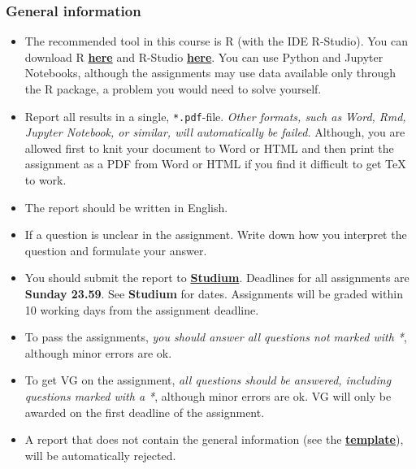 
\subsubsection*{General information}

\begin{itemize}
\itemsep0em
\item The recommended tool in this course is R (with the IDE R-Studio). You can download R \href{https://cran.r-project.org/}{\textbf{here}} and R-Studio \href{https://www.rstudio.com/products/rstudio/download/}{\textbf{here}}. You can use Python and Jupyter Notebooks, although the assignments may use data available only through the R package, a problem you would need to solve yourself.

\item  Report all results in a single, \texttt{*.pdf}-file. \emph{Other formats, such as Word, Rmd, Jupyter Notebook, or similar, will automatically be failed.} Although, you are allowed first to knit your document to Word or HTML and then print the assignment as a PDF from Word or HTML if you find it difficult to get TeX to work.

\item The report should be written in English.

\item If a question is unclear in the assignment. Write down how you interpret the question and formulate your answer.

\item You should submit the report to \href{https://studium.uu.se/}{\textbf{Studium}}. Deadlines for all assignments are \textbf{Sunday 23.59}. See \textbf{Studium} for dates. Assignments will be graded within 10 working days from the assignment deadline.

\item To pass the assignments, \emph{you should answer all questions not marked with *}, although minor errors are ok.

\item To get VG on the assignment, \emph{all questions should be answered, including questions marked with a *}, although minor errors are ok. VG will only be awarded on the first deadline of the assignment.

\item A report that does not contain the general information (see the \href{https://raw.githubusercontent.com/MansMeg/IntroML/master/templates/assignment_template.pdf}{\textbf{template}}), will be automatically rejected.


\end{itemize}
